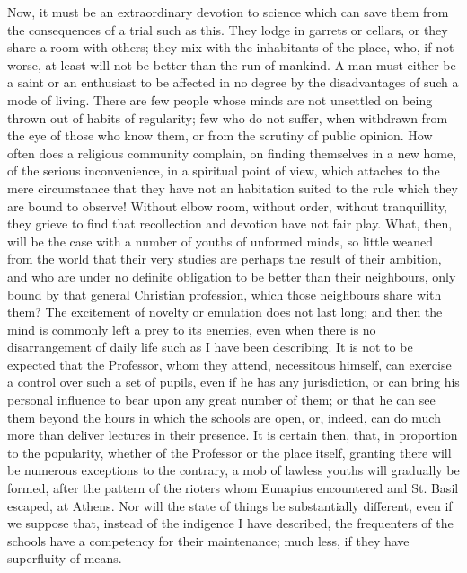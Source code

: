 Now, it must be an
extraordinary devotion to science which can save them from the
consequences of a trial such as this. They lodge in garrets or
cellars, or they share a room with others; they mix with the
inhabitants of the place, who, if not worse, at least will not be
better than the run of mankind. A man must either be a saint or an
enthusiast to be affected in no degree by the disadvantages of such a
mode of living. There are few people whose minds are not unsettled on
being thrown out of habits of regularity; few who do not suffer, when
withdrawn from the eye of those who know them, or from the scrutiny of
public opinion. How often does a religious community complain, on
finding themselves in a new home, of the serious inconvenience, in a
spiritual point of view, which attaches to the mere circumstance that
they have not an habitation suited to the rule which they are bound to
observe! Without elbow room, without order, without tranquillity, they
grieve to find that recollection and devotion have not fair play.
What, then, will be the case with a number of youths of unformed
minds, so little weaned from the world that their very studies are
perhaps the result of their ambition, and who are under no definite
obligation to be better than their neighbours, only bound by that
general Christian profession, which those neighbours share with them?
The excitement of novelty or emulation does not last long; and then
the mind is commonly left a prey to its enemies, even when there is no
disarrangement of daily life such as I have been describing. It is not
to be expected that the Professor, whom they attend, necessitous
himself, can exercise a control over such a set of pupils, even if he
has any jurisdiction, or can bring his personal influence to bear upon
any great number of them; or that he can see them beyond the hours in
which the schools are open, or, indeed, can do much more than deliver
lectures in their presence. It is certain then, that, in proportion to
the popularity, whether of the Professor or the place itself, granting
there will be numerous exceptions to the contrary, a mob of lawless
youths will gradually be formed, after the pattern of the rioters whom
Eunapius encountered and St. Basil escaped, at Athens. Nor will the
state of things be substantially different, even if we suppose that,
instead of the indigence I have described, the frequenters of the
schools have a competency for their maintenance; much less, if they
have superfluity of means.

